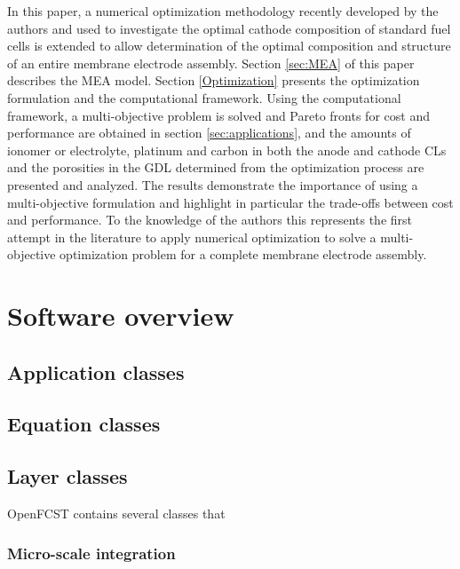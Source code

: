 \documentclass[]{elsart}
\begin{document}
In this paper, a numerical optimization methodology recently developed by the authors \cite{Secanell07a,Secanell07b} and used to investigate the optimal cathode composition of standard fuel cells is extended to allow determination of the optimal composition and structure of an entire membrane electrode assembly. Section \ref{sec:MEA} of this paper describes the MEA model. Section \ref{Optimization} presents the optimization formulation and the computational framework. Using the computational framework, a multi-objective problem is solved and Pareto fronts for cost and performance are obtained in section \ref{sec:applications}, and the amounts of ionomer or electrolyte, platinum and carbon in both the anode and cathode CLs and the porosities in the GDL  determined from the optimization process are presented and analyzed. The results demonstrate the importance of using a multi-objective formulation and highlight in particular the trade-offs between cost and performance. To the knowledge of the authors this represents the first attempt in the literature to apply numerical optimization to solve a multi-objective optimization problem for a complete membrane electrode assembly.

\section{Software overview}


\subsection{Application classes}

\subsection{Equation classes}

\subsection{Layer classes}

OpenFCST contains several classes that 


\subsubsection{Micro-scale integration}
\end{document}
